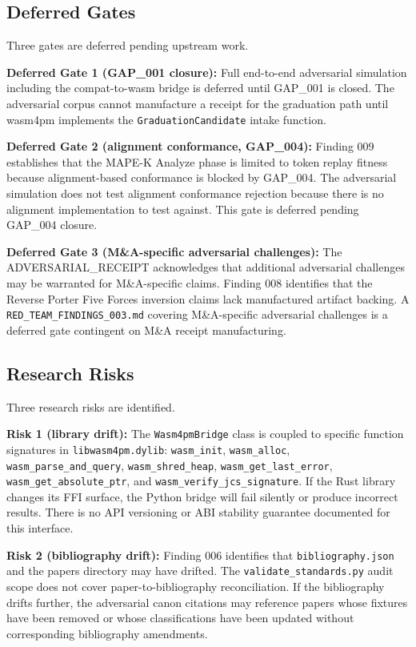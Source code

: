 \subsection{Deferred Gates}
\label{sec:adversarial-questions-deferred}

Three gates are deferred pending upstream work.

\textbf{Deferred Gate 1 (GAP\_001 closure):} Full end-to-end adversarial simulation
including the compat-to-wasm bridge is deferred until GAP\_001 is closed. The adversarial
corpus cannot manufacture a receipt for the graduation path until wasm4pm implements the
\texttt{GraduationCandidate} intake function.

\textbf{Deferred Gate 2 (alignment conformance, GAP\_004):} Finding 009 establishes that the
MAPE-K Analyze phase is limited to token replay fitness because alignment-based conformance
is blocked by GAP\_004. The adversarial simulation does not test alignment conformance
rejection because there is no alignment implementation to test against. This gate is deferred
pending GAP\_004 closure.

\textbf{Deferred Gate 3 (M\&A-specific adversarial challenges):} The ADVERSARIAL\_RECEIPT
acknowledges that additional adversarial challenges may be warranted for M\&A-specific
claims. Finding 008 identifies that the Reverse Porter Five Forces inversion claims lack
manufactured artifact backing. A \texttt{RED\_TEAM\_FINDINGS\_003.md} covering M\&A-specific
adversarial challenges is a deferred gate contingent on M\&A receipt manufacturing.

\subsection{Research Risks}
\label{sec:adversarial-questions-risks}

Three research risks are identified.

\textbf{Risk 1 (library drift):} The \texttt{Wasm4pmBridge} class is coupled to specific
function signatures in \texttt{libwasm4pm.dylib}: \texttt{wasm\_init}, \texttt{wasm\_alloc},
\texttt{wasm\_parse\_and\_query}, \texttt{wasm\_shred\_heap}, \texttt{wasm\_get\_last\_error},
\texttt{wasm\_get\_absolute\_ptr}, and \texttt{wasm\_verify\_jcs\_signature}. If the Rust
library changes its FFI surface, the Python bridge will fail silently or produce incorrect
results. There is no API versioning or ABI stability guarantee documented for this interface.

\textbf{Risk 2 (bibliography drift):} Finding 006 identifies that \texttt{bibliography.json}
and the papers directory may have drifted. The \texttt{validate\_standards.py} audit scope
does not cover paper-to-bibliography reconciliation. If the bibliography drifts further, the
adversarial canon citations may reference papers whose fixtures have been removed or whose
classifications have been updated without corresponding bibliography amendments.

